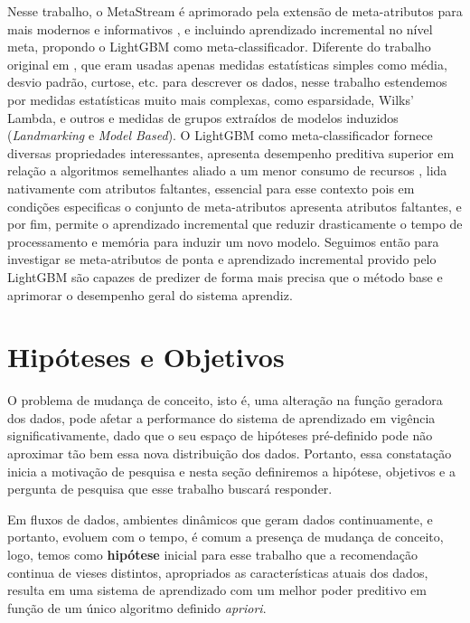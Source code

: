 Nesse trabalho, o MetaStream é aprimorado pela extensão de meta-atributos para mais modernos e informativos \cite{Rivolli2018}, e incluindo aprendizado incremental no nível meta, propondo o  LightGBM \cite{ke2017lightgbm} como meta-classificador. Diferente do trabalho original em \cite{rossi2014metastream}, que eram usadas apenas medidas estatísticas simples como média, desvio padrão, curtose, etc. para descrever os dados, nesse trabalho estendemos por medidas estatísticas muito mais complexas, como esparsidade, Wilks' Lambda, e outros e medidas de grupos extraídos de modelos induzidos (\textit{Landmarking} e \textit{Model Based}). O LightGBM como meta-classificador fornece diversas propriedades interessantes, apresenta desempenho preditiva superior em relação a algoritmos semelhantes aliado a um menor consumo de recursos \cite{lightgbmBench}, lida nativamente com atributos faltantes, essencial para esse contexto pois em condições especificas o conjunto de meta-atributos apresenta atributos faltantes, e por fim, permite o aprendizado incremental que reduzir drasticamente o tempo de processamento e memória para induzir um novo modelo. Seguimos então para investigar se meta-atributos de ponta e aprendizado incremental provido pelo LightGBM são capazes de predizer de forma mais precisa que o método base e aprimorar o desempenho geral do sistema aprendiz.


\section{Hipóteses e Objetivos}

O problema de mudança de conceito, isto é, uma alteração na função geradora dos dados, pode afetar a performance do sistema de aprendizado em vigência significativamente, dado que o seu espaço de hipóteses pré-definido pode não aproximar tão bem essa nova distribuição dos dados. Portanto, essa constatação inicia a motivação de pesquisa e nesta seção definiremos a hipótese, objetivos e a pergunta de pesquisa que esse trabalho buscará responder.

Em fluxos de dados, ambientes dinâmicos que geram dados continuamente, e portanto, evoluem com o tempo, é comum a presença de mudança de conceito, logo, temos como \textbf{hipótese} inicial para esse trabalho que a recomendação continua de vieses distintos, apropriados as características atuais dos dados, resulta em uma sistema de aprendizado com um melhor poder preditivo em função de um único algoritmo definido \textit{apriori}.

